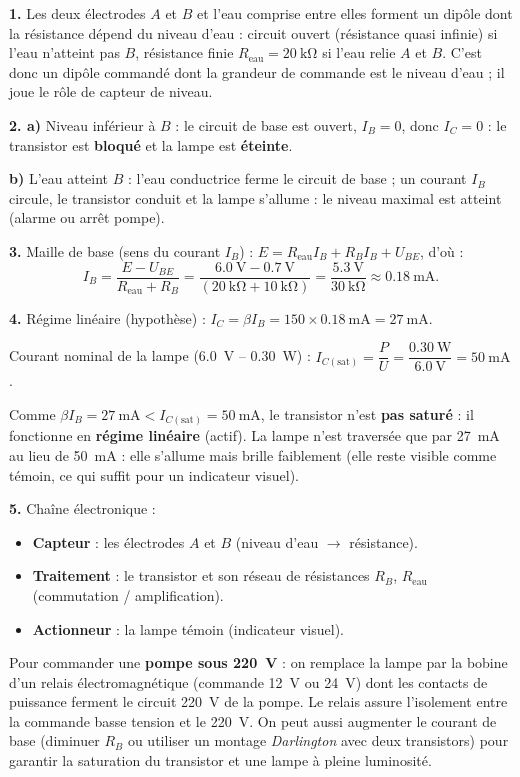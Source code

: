 \documentclass[11pt]{article}
\newcommand{\cle}[1]{{\popxbold\color{popdark}#1}}
\begin{document}
\begin{corrige}
\textbf{1.} Les deux électrodes $A$ et $B$ et l'eau comprise entre elles forment un dipôle dont la résistance dépend du niveau d'eau : circuit ouvert (résistance quasi infinie) si l'eau n'atteint pas $B$, résistance finie $R_{\text{eau}} = \SI{20}{\kilo\ohm}$ si l'eau relie $A$ et $B$. C'est donc un dipôle commandé dont la grandeur de commande est le \cle{niveau d'eau} ; il joue le rôle de \cle{capteur de niveau}.

\textbf{2. a)} Niveau inférieur à $B$ : le circuit de base est ouvert, $I_B = 0$, donc $I_C = 0$ : le transistor est \textbf{bloqué} et la lampe est \textbf{éteinte}.

\textbf{b)} L'eau atteint $B$ : l'eau conductrice ferme le circuit de base ; un courant $I_B$ circule, le transistor conduit et la lampe s'allume : le niveau maximal est atteint (alarme ou arrêt pompe).

\textbf{3.} Maille de base (sens du courant $I_B$) : $E = R_{\text{eau}} I_B + R_B I_B + U_{BE}$, d'où :
\[ I_B = \frac{E - U_{BE}}{R_{\text{eau}} + R_B} = \frac{\SI{6,0}{\volt} - \SI{0,7}{\volt}}{(\SI{20}{\kilo\ohm} + \SI{10}{\kilo\ohm})} = \frac{\SI{5,3}{\volt}}{\SI{30}{\kilo\ohm}} \approx \SI{0,18}{\milli\ampere}. \]

\textbf{4.} Régime linéaire (hypothèse) : $I_C = \beta I_B = 150 \times \SI{0,18}{\milli\ampere} = \SI{27}{\milli\ampere}$.

Courant nominal de la lampe (\SI{6,0}{\volt} -- \SI{0,30}{\watt}) : $I_{C(\text{sat})} = \dfrac{P}{U} = \dfrac{\SI{0,30}{\watt}}{\SI{6,0}{\volt}} = \SI{50}{\milli\ampere}$.

Comme $\beta I_B = \SI{27}{\milli\ampere} < I_{C(\text{sat})} = \SI{50}{\milli\ampere}$, le transistor n'est \textbf{pas saturé} : il fonctionne en \textbf{régime linéaire} (actif). La lampe n'est traversée que par \SI{27}{\milli\ampere} au lieu de \SI{50}{\milli\ampere} : elle s'allume mais brille faiblement (elle reste visible comme témoin, ce qui suffit pour un indicateur visuel).

\textbf{5.} Chaîne électronique :
\begin{itemize}
\item \textbf{Capteur} : les électrodes $A$ et $B$ (niveau d'eau $\rightarrow$ résistance).
\item \textbf{Traitement} : le transistor et son réseau de résistances $R_B$, $R_{\text{eau}}$ (commutation / amplification).
\item \textbf{Actionneur} : la lampe témoin (indicateur visuel).
\end{itemize}
Pour commander une \textbf{pompe sous \SI{220}{\volt}} : on remplace la lampe par la bobine d'un \cle{relais électromagnétique} (commande \SI{12}{\volt} ou \SI{24}{\volt}) dont les contacts de puissance ferment le circuit \SI{220}{\volt} de la pompe. Le relais assure l'isolement entre la commande basse tension et le \SI{220}{\volt}. On peut aussi augmenter le courant de base (diminuer $R_B$ ou utiliser un montage \emph{Darlington} avec deux transistors) pour garantir la saturation du transistor et une lampe à pleine luminosité.
\end{corrige}
\end{document}

